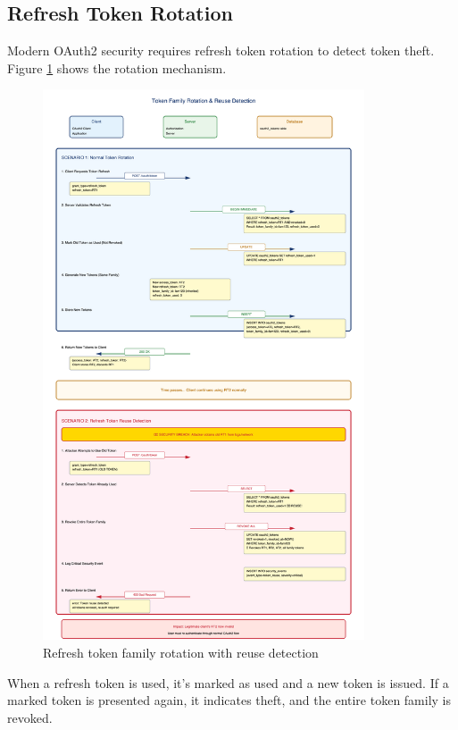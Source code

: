 \documentclass[12pt,a4paper]{article}
\begin{document}
\subsection{Refresh Token Rotation}

Modern OAuth2 security requires refresh token rotation to detect token theft. Figure \ref{fig:token_rotation} shows the rotation mechanism.

\begin{figure}[H]
    \centering
    \includegraphics[width=0.85\textwidth]{diagrams/14_token_family_rotation.png}
    \caption{Refresh token family rotation with reuse detection}
    \label{fig:token_rotation}
\end{figure}

When a refresh token is used, it's marked as used and a new token is issued. If a marked token is presented again, it indicates theft, and the entire token family is revoked.
\end{document}
